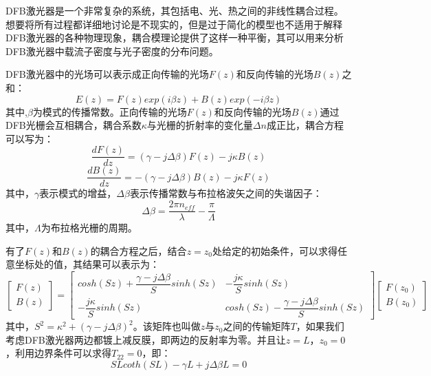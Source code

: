 DFB激光器是一个非常复杂的系统，其包括电、光、热之间的非线性耦合过程。想要将所有过程都详细地讨论是不现实的，但是过于简化的模型也不适用于解释DFB激光器的各种物理现象，耦合模理论提供了这样一种平衡，其可以用来分析DFB激光器中载流子密度与光子密度的分布问题。

DFB激光器中的光场可以表示成正向传输的光场$F(z)$和反向传输的光场$B(z)$之和：
\begin{equation}
\label{field_sum}
E(z) = F(z)exp(i\beta z) + B(z)exp(-i\beta z)
\end{equation}
其中,$\beta$为模式的传播常数。正向传输的光场$F(z)$和反向传输的光场$B(z)$通过DFB光栅会互相耦合，耦合系数$\kappa$与光栅的折射率的变化量$\Delta n$成正比，耦合方程可以写为：
\begin{equation}
\label{coupling_dfb1}
\dfrac{dF(z)}{dz} = (\gamma-j\Delta \beta)F(z)-j\kappa B(z)
\end{equation}
\begin{equation}
\label{coupling_dfb2}
\dfrac{dB(z)}{dz} = -(\gamma-j\Delta \beta)B(z)-j\kappa F(z)
\end{equation}
其中，$\gamma$表示模式的增益，$\Delta\beta$表示传播常数与布拉格波矢之间的失谐因子：
\begin{equation}
\label{delta_beta}
\Delta\beta = \dfrac{2\pi n_{eff}}{\lambda} - \dfrac{\pi}{\Lambda}
\end{equation}
其中，$\Lambda$为布拉格光栅的周期。

有了$F(z)$和$B(z)$的耦合方程之后，结合$z=z_0$处给定的初始条件，可以求得任意坐标处的值，其结果可以表示为：
\begin{equation}
\label{coupling_result}
\left[\begin{matrix}
F(z) \\
B(z)
\end{matrix}\right] = \left[\begin{matrix}
cosh(Sz)+\dfrac{\gamma-j\Delta\beta}{S}sinh(Sz) & -\dfrac{j\kappa}{S}sinh(Sz) \\ 
-\dfrac{j\kappa}{S}sinh(Sz) & cosh(Sz)-\dfrac{\gamma-j\Delta\beta}{S}sinh(Sz)
\end{matrix}\right]\left[\begin{matrix}
F(z_0)\\
B(z_0)
\end{matrix}\right]
\end{equation}
其中，$S^2 = \kappa^2+(\gamma-j\Delta\beta)^2$。该矩阵也叫做$z$与$z_0$之间的传输矩阵$T$，如果我们考虑DFB激光器两边都镀上减反膜，即两边的反射率为零。并且让$z=L$，$z_0=0$，利用边界条件可以求得$T_{22}=0$，即：
\begin{equation}
\label{boudary_condition_result}
SLcoth(SL) - \gamma L + j\Delta\beta L = 0
\end{equation}

